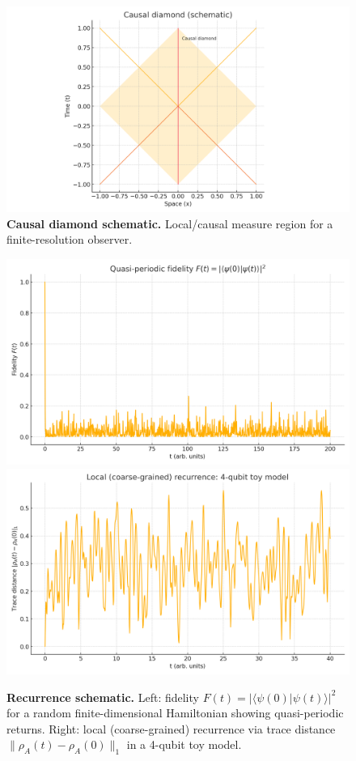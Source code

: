 \documentclass[12pt]{article}
\theoremstyle{remark}
\begin{document}
\begin{figure}[h]
  \centering
\includegraphics[width=0.6\linewidth]{figs/fig_causal_diamond.png}
  \caption{\textbf{Causal diamond schematic.} Local/causal measure region for a finite-resolution observer.}
\end{figure}

\begin{figure}[h]
  \centering
\includegraphics[width=0.48\linewidth]{figs/fig_fidelity.png}
\includegraphics[width=0.48\linewidth]{figs/fig_trace_distance.png}
  \caption{\textbf{Recurrence schematic.} Left: fidelity $F(t)=|\langle\psi(0)|\psi(t)\rangle|^2$ for a random finite-dimensional Hamiltonian showing quasi-periodic returns. Right: local (coarse-grained) recurrence via trace distance $\|\rho_A(t)-\rho_A(0)\|_1$ in a 4-qubit toy model.}
\end{figure}
\end{document}
